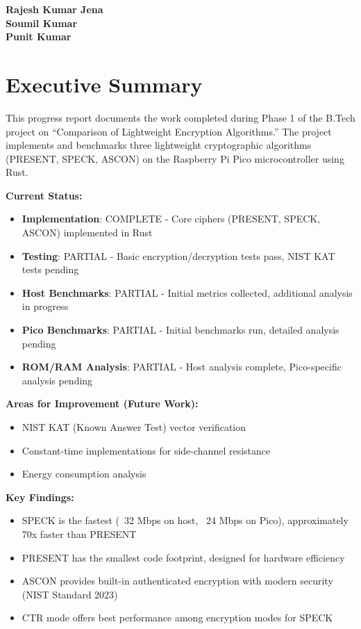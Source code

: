 \documentclass[12pt]{report}
\begin{document}
\vspace{1cm}

\noindent \textbf{Rajesh Kumar Jena}\\
\textbf{Soumil Kumar}\\
\textbf{Punit Kumar}

\newpage
\chapter*{Executive Summary}

This progress report documents the work completed during Phase 1 of the B.Tech project on
``Comparison of Lightweight Encryption Algorithms.'' The project implements and benchmarks
three lightweight cryptographic algorithms (PRESENT, SPECK, ASCON) on the Raspberry Pi
Pico microcontroller using Rust.

\vspace{0.3cm}
\textbf{Current Status:}
\begin{itemize}
    \item \textbf{Implementation}: COMPLETE - Core ciphers (PRESENT, SPECK, ASCON) implemented in Rust
    \item \textbf{Testing}: PARTIAL - Basic encryption/decryption tests pass, NIST KAT tests pending
    \item \textbf{Host Benchmarks}: PARTIAL - Initial metrics collected, additional analysis in progress
    \item \textbf{Pico Benchmarks}: PARTIAL - Initial benchmarks run, detailed analysis pending
    \item \textbf{ROM/RAM Analysis}: PARTIAL - Host analysis complete, Pico-specific analysis pending
\end{itemize}

\vspace{0.3cm}
\textbf{Areas for Improvement (Future Work):}
\begin{itemize}
    \item NIST KAT (Known Answer Test) vector verification
    \item Constant-time implementations for side-channel resistance
    \item Energy consumption analysis
\end{itemize}

\vspace{0.3cm}
\textbf{Key Findings:}
\begin{itemize}
    \item SPECK is the fastest (~32 Mbps on host, ~24 Mbps on Pico), approximately 70x faster than PRESENT
    \item PRESENT has the smallest code footprint, designed for hardware efficiency
    \item ASCON provides built-in authenticated encryption with modern security (NIST Standard 2023)
    \item CTR mode offers best performance among encryption modes for SPECK
\end{itemize}
\end{document}
